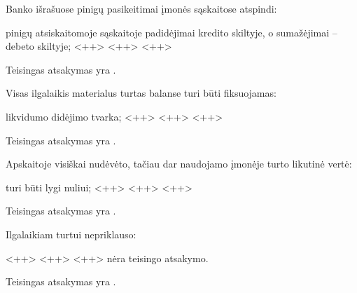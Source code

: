 \begin{tasks}
  \begin{task}
    \begin{condition}
      Banko išrašuose pinigų pasikeitimai įmonės sąskaitose atspindi:
      \begin{enumerate}
         pinigų atsiskaitomoje sąskaitoje padidėjimai
          kredito skiltyje, o sumažėjimai – debeto skiltyje;
         <++>
         <++>
         <++>
      \end{enumerate}
    \end{condition}
    \begin{solution}
      Teisingas atsakymas yra .
    \end{solution}
  \end{task}

  \begin{task}
    \begin{condition}
      Visas ilgalaikis materialus turtas balanse turi būti fiksuojamas:
      \begin{enumerate}
         likvidumo didėjimo tvarka;
         <++>
         <++>
         <++>
      \end{enumerate}
    \end{condition}
    \begin{solution}
      Teisingas atsakymas yra .
    \end{solution}
  \end{task}

  \begin{task}
    \begin{condition}
      Apskaitoje visiškai nudėvėto, tačiau dar naudojamo įmonėje
      turto likutinė vertė:
      \begin{enumerate}
         turi būti lygi nuliui;
         <++>
         <++>
         <++>
      \end{enumerate}
    \end{condition}
    \begin{solution}
      Teisingas atsakymas yra .
    \end{solution}
  \end{task}

  \begin{task}
    \begin{condition}
      Ilgalaikiam turtui nepriklauso:
      \begin{enumerate}
         <++>
         <++>
         <++>
         nėra teisingo atsakymo.
      \end{enumerate}
    \end{condition}
    \begin{solution}
      Teisingas atsakymas yra .
    \end{solution}
  \end{task}


\end{tasks}
